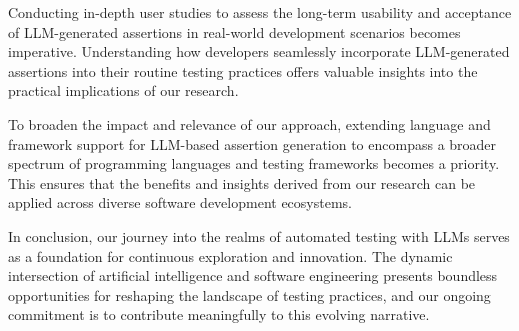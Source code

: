 Conducting in-depth user studies to assess the long-term usability and acceptance of LLM-generated assertions in real-world development scenarios becomes imperative. Understanding how developers seamlessly incorporate LLM-generated assertions into their routine testing practices offers valuable insights into the practical implications of our research.

To broaden the impact and relevance of our approach, extending language and framework support for LLM-based assertion generation to encompass a broader spectrum of programming languages and testing frameworks becomes a priority. This ensures that the benefits and insights derived from our research can be applied across diverse software development ecosystems.

In conclusion, our journey into the realms of automated testing with LLMs serves as a foundation for continuous exploration and innovation. The dynamic intersection of artificial intelligence and software engineering presents boundless opportunities for reshaping the landscape of testing practices, and our ongoing commitment is to contribute meaningfully to this evolving narrative.